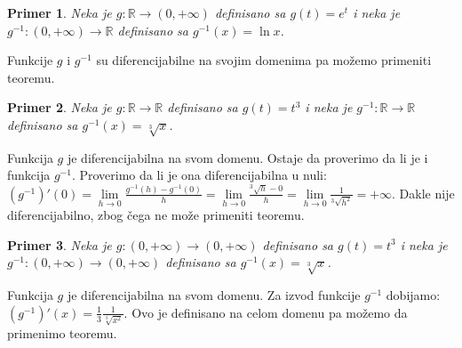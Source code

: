 \documentclass{article}
\newtheorem{prim}{Primer}[section]
\begin{document}
\begin{primbox}
    \begin{prim}
        Neka je $g: \mathbb{R} \longrightarrow (0, +\infty)$ definisano sa
        $g(t) = e^t$ i neka je $g^{-1}:(0, +\infty)\longrightarrow \mathbb{R}$
        definisano sa $g^{-1}(x) = \ln{x}$.
    \end{prim}
    Funkcije $g$ i $g^{-1}$
    su diferencijabilne na svojim domenima pa možemo primeniti teoremu.
\end{primbox}
\begin{primbox}
    \begin{prim}
        Neka je $g:\mathbb{R}\longrightarrow\mathbb{R}$
        definisano sa $g(t) = t^3$ i neka je $g^{-1}:\mathbb{R}\longrightarrow\mathbb{R}$
        definisano sa $g^{-1}(x) = \sqrt[3]{x}$.
    \end{prim}
    Funkcija $g$ je diferencijabilna
    na svom domenu. Ostaje da proverimo da li je i funkcija $g^{-1}$. Proverimo da li je ona diferencijabilna u nuli:
    $(g^{-1})'(0) = \lim\limits_{h\rightarrow 0}\frac{g^{-1}(h) - g^{-1}(0)}{h} = \lim\limits_{h\rightarrow 0}\frac{^3\sqrt{h} - 0}{h} = \lim\limits_{h\rightarrow 0}\frac{1}{^3\sqrt{h^2}} = +\infty$.
    Dakle nije diferencijabilno, zbog čega ne može primeniti teoremu.\par
\end{primbox}
\begin{primbox}
    \begin{prim}
        Neka je $g: (0, +\infty) \longrightarrow (0, +\infty)$
        definisano sa $ g(t) = t^3$ i neka je $g^{-1}: (0,+\infty)\longrightarrow(0,+\infty)$
        definisano sa $ g^{-1}(x) = \sqrt[3]{x}$.
    \end{prim}
    Funkcija $g$ je diferencijabilna na svom domenu.
    Za izvod funkcije $g^{-1}$ dobijamo: $(g^{-1})'(x) = \frac{1}{3}\frac{1}{\sqrt[3]{x^2}}$.
    Ovo je definisano na celom domenu pa možemo da primenimo teoremu.\par
\end{primbox}
\end{document}
